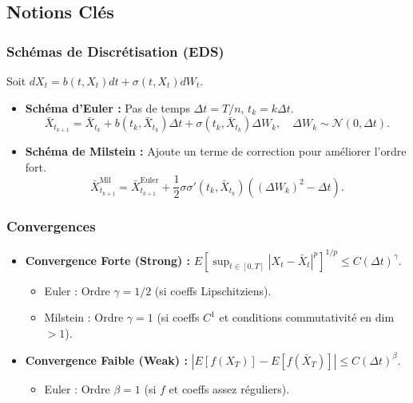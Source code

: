 \documentclass[a4paper,11pt]{article}
\begin{document}
\subsection{Notions Clés}

\subsubsection{Schémas de Discrétisation (EDS)}
Soit $dX_t = b(t, X_t)dt + \sigma(t, X_t)dW_t$.
\begin{itemize}
    \item \textbf{Schéma d'Euler :} Pas de temps $\Delta t = T/n$, $t_k = k \Delta t$.
    \[ \bar{X}_{t_{k+1}} = \bar{X}_{t_k} + b(t_k, \bar{X}_{t_k})\Delta t + \sigma(t_k, \bar{X}_{t_k})\Delta W_k, \quad \Delta W_k \sim \mathcal{N}(0, \Delta t). \]
    \item \textbf{Schéma de Milstein :} Ajoute un terme de correction pour améliorer l'ordre fort.
    \[ \bar{X}_{t_{k+1}}^{\text{Mil}} = \bar{X}_{t_{k+1}}^{\text{Euler}} + \frac{1}{2}\sigma\sigma'(t_k, \bar{X}_{t_k})((\Delta W_k)^2 - \Delta t). \]
\end{itemize}

\subsubsection{Convergences}
\begin{itemize}
    \item \textbf{Convergence Forte (Strong) :} $E[\sup_{t \in [0,T]} |X_t - \bar{X}_t|^p]^{1/p} \le C (\Delta t)^{\gamma}$.
    \begin{itemize}
        \item Euler : Ordre $\gamma = 1/2$ (si coeffs Lipschitziens).
        \item Milstein : Ordre $\gamma = 1$ (si coeffs $C^1$ et conditions commutativité en dim $>1$).
    \end{itemize}
    \item \textbf{Convergence Faible (Weak) :} $|E[f(X_T)] - E[f(\bar{X}_T)]| \le C (\Delta t)^{\beta}$.
    \begin{itemize}
        \item Euler : Ordre $\beta = 1$ (si $f$ et coeffs assez réguliers).
    \end{itemize}
\end{itemize}
\end{document}
